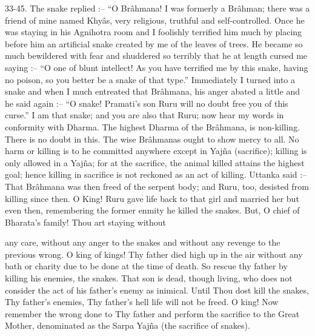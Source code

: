 33-45. The snake replied :-- ``O Br\^ahmana! I was formerly a Br\^ahman; there was a friend of mine named Khy\^as, very religious, truthful and self-controlled. Once he was staying in his Agnihotra room and I foolishly terrified him much by placing before him an artificial snake created by me of the leaves of trees. He became so much bewildered with fear and shuddered so terribly that he at length cursed me saying :-- ``O one of blunt intellect! As you have terrified me by this snake, having no poison, so you better be a snake of that type.'' Immediately I turned into a snake and when I much entreated that Br\^ahmana, his anger abated a little and he said again :-- ``O snake! Pramati's son Ruru will no doubt free you of this curse.'' I am that snake; and you are also that Ruru; now hear my words in conformity with Dharma. The highest Dharma of the Br\^ahmana, is non-killing. There is no doubt in this. The wise Br\^ahmanas ought to show mercy to all. No harm or killing is to he committed anywhere except in Yaj\~na (sacrifice); killing is only allowed in a Yaj\~na; for at the sacrifice, the animal killed attains the highest goal; hence killing in sacrifice is not reckoned as an act of killing. Uttanka said :-- That Br\^ahmana was then freed of the serpent body; and Ruru, too, desisted from killing since then. O King! Ruru gave life back to that girl and married her but even then, remembering the former enmity he killed the snakes. But, O chief of Bharata's family! Thou art staying without

any care, without any anger to the snakes and without any revenge to the previous wrong. O king of kings! Thy father died high up in the air without any bath or charity due to be done at the time of death. So rescue thy father by killing his enemies, the snakes. That son is dead, though living, who does not consider the act of his father's enemy as inimical. Until Thou dost kill the snakes, Thy father's enemies, Thy father's hell life will not be freed. O king! Now remember the wrong done to Thy father and perform the sacrifice to the Great Mother, denominated as the Sarpa Yaj\~na (the sacrifice of snakes).

